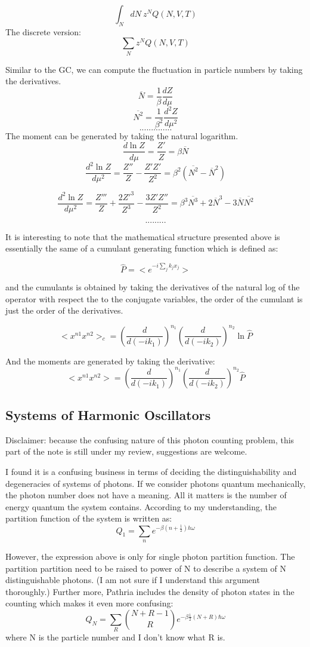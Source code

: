 \documentclass[12pt, oneside]{article}   	%
\begin{document}
$$\int_N dN \: z^N Q(N,V,T)$$
The discrete version: 
$$\sum_N  z^N Q(N,V,T)$$

Similar to the GC, we can compute the fluctuation in particle numbers by taking the derivatives. 
$$\overline{N} = \frac{1}{\beta} \frac{d Z}{d \mu}$$
$$\overline{N^2} = \frac{1}{\beta^2} \frac{d^2 Z}{d \mu^2}$$
$$..............$$
The moment can be generated by taking the natural logarithm. 
$$\frac{d \ln Z}{d \mu} = \frac{Z'}{Z}= \beta \overline{N}$$
$$\frac{d^2 \ln Z}{d \mu^2} = \frac{Z''}{Z}- \frac{Z'Z'}{Z^2}= \beta^2 (\overline{N^2 } -\overline{N }^2) $$

$$\frac{d^2 \ln Z}{d \mu^2} = \frac{Z'''}{Z}+\frac{2 Z'^3}{Z^3}-\frac{3 Z' Z''}{Z^2} = \beta^3 \overline{N^3} + 2 \overline{N}^3 - 3 \overline{N} \overline{N^2}$$

$$.........$$

It is interesting to note that the mathematical structure presented above is essentially the same of a cumulant generating function which is defined as: 

$$\hat{P} = <e^{-i \sum_j k_j x_j}>$$

and the cumulants is obtained by taking the derivatives of the natural log of the operator with respect the to the conjugate variables, the order of the cumulant is just the order of the derivatives. 

$$<x^{n1} x^{n2}>_c = (\frac{d}{d(-i k_1)})^{n_1} (\frac{d}{d(-i k_2)})^{n_2} \ln \hat{P}$$

And the moments are generated by taking the derivative:
$$<x^{n1} x^{n2}> = (\frac{d}{d(-i k_1)})^{n_1} (\frac{d}{d(-i k_2)})^{n_2} \hat{P}$$
 

\subsection{Systems of Harmonic Oscillators}
\par 
Disclaimer: because the confusing nature of this photon counting problem, this part of the note is still under my review, suggestions are welcome. 
\par 
I found it is a confusing business in terms of deciding the distinguishability and degeneracies of systems of photons. If we consider photons quantum mechanically, the photon number does not have a meaning. All it matters is the number of energy quantum the system contains. According to my understanding, the partition function of the system is written as: 
$$Q_1 = \sum_n e^{- \beta(n + \frac{1}{2}) h \omega}$$ 
\par 
However, the expression above is only for single photon partition function. The partition partition need to be raised to power of N to describe a system of N distinguishable photons. (I am not sure if I understand this argument thoroughly.) Further more, Pathria includes the density of photon states in the counting which makes it even more confusing: 
$$Q_N = \sum_R {{N+R-1}\choose{R}}e^{-\beta \frac{1}{2} (N+R) \hbar \omega}$$
where N is the particle number and I don't know what R is. 
\end{document}
